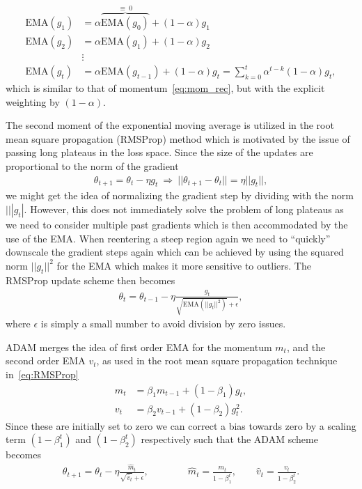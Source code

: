 \begin{align*}
    \text{EMA}(g_1) &= \alpha \overbrace{\text{EMA}(g_0)}^{\equiv \ 0} + (1-\alpha)g_1 \\
    \text{EMA}(g_2) &= \alpha \text{EMA}(g_1) + (1-\alpha)g_2 \\
    &\vdots \\
    \text{EMA}(g_t) &= \alpha \text{EMA}(g_{t-1}) + (1-\alpha)g_t  = \sum_{k=0}^t \alpha^{t-k}(1-\alpha)g_t,
\end{align*}
which is similar to that of momentum~\cref{eq:mom_rec}, but with the explicit weighting by $(1-\alpha)$.

The second moment of the exponential moving average is utilized in the root mean square propagation (\acrshort{RMSProp}) method which is motivated by the issue of passing long plateaus in the loss space. Since the size of the updates are proportional to the norm of the gradient
\begin{align*}
  \theta_{t+1} = \theta_t - \eta g_t \ \Longrightarrow \ ||\theta_{t+1}-\theta_{t}|| = \eta ||g_t||,
\end{align*}
we might get the idea of normalizing the gradient step by dividing with the norm $|||g_t|$.  However, this does not immediately solve the problem of long plateaus as we need to consider multiple past gradients which is then accommodated by the use of the \acrshort{EMA}. When reentering a steep region again we need to ``quickly'' downscale the gradient steps again which can be achieved by using the squared norm $||g_t||^2$ for the \acrshort{EMA} which makes it more sensitive to outliers. The \acrshort{RMSProp} update scheme then becomes
\begin{align}
  \theta_t = \theta_{t-1} - \eta \frac{g_t}{\sqrt{\text{EMA}(||g_t||^2)}+ \epsilon},
  \label{eq:RMSProp}
\end{align}
where $\epsilon$ is simply a small number to avoid division by zero issues. 

ADAM merges the idea of first order \acrshort{EMA} for the momentum $m_t$, and the second order \acrshort{EMA} $v_t$, as used in the root mean square propagation technique in~\cref{eq:RMSProp}
\begin{align*}
  m_t &= \beta_1 m_{t-1} + (1-\beta_1)g_t, \\
  v_t &= \beta_2 v_{t-1} + (1-\beta_2)g_t^2. 
\end{align*}
Since these are initially set to zero we can correct a bias towards zero by a scaling term $(1-\beta^t_1)$ and $(1-\beta^t_2)$ respectively such that the ADAM scheme becomes
\begin{align}
  \theta_{t+1} = \theta_t - \eta \frac{\hat{m}_t}{\sqrt{\hat{v}_t} + \epsilon}, \qquad \qquad \hat{m}_t = \frac{m_t}{1-\beta^t_1}, \qquad \hat{v}_t = \frac{v_t}{1-\beta^t_2}.
  \label{eq:ADAM}
\end{align}


